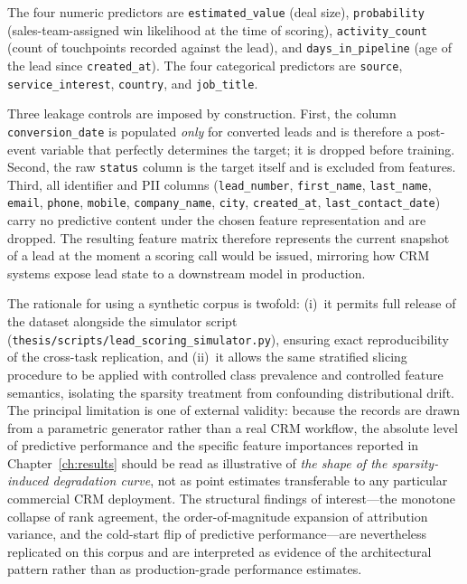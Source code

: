 The four numeric predictors are \texttt{estimated\_value} (deal size),
\texttt{probability} (sales-team-assigned win likelihood at the time of
scoring), \texttt{activity\_count} (count of touchpoints recorded against
the lead), and \texttt{days\_in\_pipeline} (age of the lead since
\texttt{created\_at}). The four categorical predictors are
\texttt{source}, \texttt{service\_interest}, \texttt{country}, and
\texttt{job\_title}.

Three leakage controls are imposed by construction. First, the column
\texttt{conversion\_date} is populated \emph{only} for converted leads and
is therefore a post-event variable that perfectly determines the target;
it is dropped before training. Second, the raw \texttt{status} column is
the target itself and is excluded from features. Third, all
identifier and PII columns (\texttt{lead\_number},
\texttt{first\_name}, \texttt{last\_name}, \texttt{email},
\texttt{phone}, \texttt{mobile}, \texttt{company\_name}, \texttt{city},
\texttt{created\_at}, \texttt{last\_contact\_date}) carry no
predictive content under the chosen feature representation and are
dropped. The resulting feature matrix therefore represents the current
snapshot of a lead at the moment a scoring call would be issued, mirroring
how CRM systems expose lead state to a downstream model in production.

The rationale for using a synthetic corpus is twofold: (i)~it permits full
release of the dataset alongside the simulator script
(\texttt{thesis/scripts/lead\_scoring\_simulator.py}), ensuring exact
reproducibility of the cross-task replication, and (ii)~it allows the same
stratified slicing procedure to be applied with controlled class prevalence
and controlled feature semantics, isolating the sparsity treatment from
confounding distributional drift. The principal limitation is one of
external validity: because the records are drawn from a parametric
generator rather than a real CRM workflow, the absolute level of
predictive performance and the specific feature importances reported in
Chapter~\ref{ch:results} should be read as illustrative of \emph{the
shape of the sparsity-induced degradation curve}, not as point estimates
transferable to any particular commercial CRM deployment. The structural
findings of interest---the monotone collapse of rank agreement, the
order-of-magnitude expansion of attribution variance, and the cold-start
flip of predictive performance---are nevertheless replicated on this
corpus and are interpreted as evidence of the architectural pattern
rather than as production-grade performance estimates.

